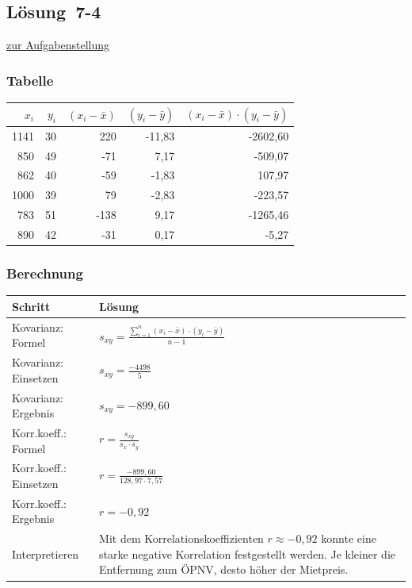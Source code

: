 \documentclass[
  11pt,
  ngerman,
  a4paper,
]{report}
\begin{document}
\hypertarget{loesung-7-4}{%
\subsection{Lösung~7-4}\label{loesung-7-4}}

\protect\hyperlink{aufgabe-7-4}{zur Aufgabenstellung}

\hypertarget{tabelle-1}{%
\subsubsection{Tabelle}\label{tabelle-1}}

\begin{table}[H]
\centering
\begin{tabular}{rrrrr}
\toprule
\textbf{$x_i$} & \textbf{$y_i$} & \textbf{$(x_i-\bar{x})$} & \textbf{$(y_i-\bar{y})$} & \textbf{$(x_i-\bar{x})\cdot(y_i-\bar{y})$}\\
\midrule
1141 & 30 & 220 & -11,83 & -2602,60\\
850 & 49 & -71 & 7,17 & -509,07\\
862 & 40 & -59 & -1,83 & 107,97\\
1000 & 39 & 79 & -2,83 & -223,57\\
783 & 51 & -138 & 9,17 & -1265,46\\
890 & 42 & -31 & 0,17 & -5,27\\
\bottomrule
\end{tabular}
\end{table}

\hypertarget{berechnung-1}{%
\subsubsection{Berechnung}\label{berechnung-1}}

\begin{table}[H]
\centering
\begin{tabular}{ll}
\toprule
\textbf{Schritt} & \textbf{Lösung}\\
\midrule
Kovarianz: Formel & $s_{xy}=\frac{\displaystyle \sum_{i=1}^{n}(x_{i}- \bar{x})\cdot(y_{i}-\bar{y})}{n-1}$\\
Kovarianz: Einsetzen & $s_{xy}=\frac{-4498}{5}$\\
Kovarianz: Ergebnis & $s_{xy}=-899{,}60$\\
Korr.koeff.: Formel & $r=\frac{s_{xy}}{s_x \cdot s_y}$\\
Korr.koeff.: Einsetzen & $r=\frac{-899{,}60}{128{,}97 \cdot 7{,}57}$\\
Korr.koeff.: Ergebnis & $r=-0{,}92$\\
Interpretieren & Mit dem Korrelationskoeffizienten $r\approx-0{,}92$ konnte eine starke negative Korrelation festgestellt werden. Je kleiner die Entfernung zum ÖPNV, desto höher der Mietpreis.\\
\bottomrule
\end{tabular}
\end{table}
\end{document}
